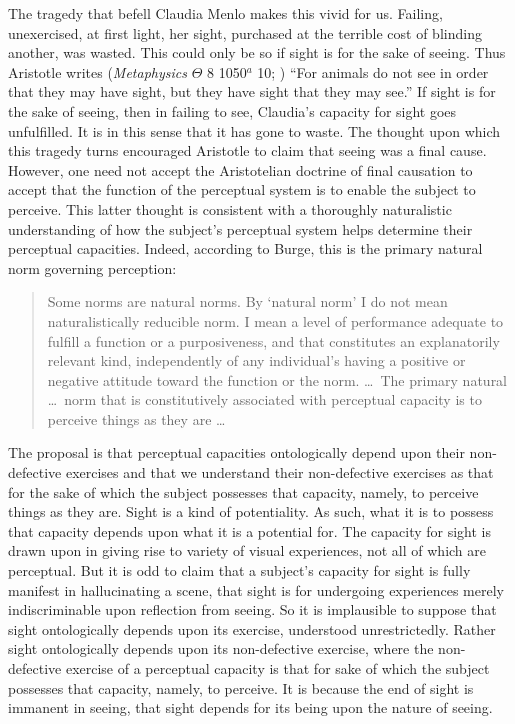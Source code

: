 \documentclass[12pt]{article}
\begin{document}
The tragedy that befell Claudia Menlo makes this vivid for us. Failing, unexercised, at first light, her sight, purchased at the terrible cost of blinding another, was wasted. This could only be so if sight is for the sake of seeing. Thus Aristotle writes (\emph{Metaphysics} \( \Theta \) 8 1050\( ^{a} \) 10; \citealt{Barnes:1984kx}) ``For animals do not see in order that they may have sight, but they have sight that they may see.'' If sight is for the sake of seeing, then in failing to see, Claudia's capacity for sight goes unfulfilled. It is in this sense that it has gone to waste. The thought upon which this tragedy turns encouraged Aristotle to claim that seeing was a final cause. However, one need not accept the Aristotelian doctrine of final causation to accept that the function of the perceptual system is to enable the subject to perceive. This latter thought is consistent with a thoroughly naturalistic understanding of how the subject's perceptual system helps determine their perceptual capacities. Indeed, according to Burge, this is the primary natural norm governing perception:
\begin{quote}
	Some norms are natural norms. By ‘natural norm’ I do not mean naturalistically reducible norm. I mean a level of performance adequate to fulfill a function or a purposiveness, and that constitutes an explanatorily relevant kind, independently of any individual’s having a positive or negative attitude toward the function or the norm. \ldots\ The primary natural \dots\ norm that is constitutively associated with perceptual capacity is to perceive things as they are \ldots\ \citep[311--312]{Burge:2010uq}
\end{quote}

The proposal is that perceptual capacities ontologically depend upon their non-defective exercises and that we understand their non-defective exercises as that for the sake of which the subject possesses that capacity, namely, to perceive things as they are. Sight is a kind of potentiality. As such, what it is to possess that capacity depends upon what it is a potential for. The capacity for sight is drawn upon in giving rise to variety of visual experiences, not all of which are perceptual. But it is odd to claim that a subject's capacity for sight is fully manifest in hallucinating a scene, that sight is for undergoing experiences merely indiscriminable upon reflection from seeing. So it is implausible to suppose that sight ontologically depends upon its exercise, understood unrestrictedly. Rather sight ontologically depends upon its non-defective exercise, where the non-defective exercise of a perceptual capacity is that for sake of which the subject possesses that capacity, namely, to perceive. It is because the end of sight is immanent in seeing, that sight depends for its being upon the nature of seeing.
\end{document}
